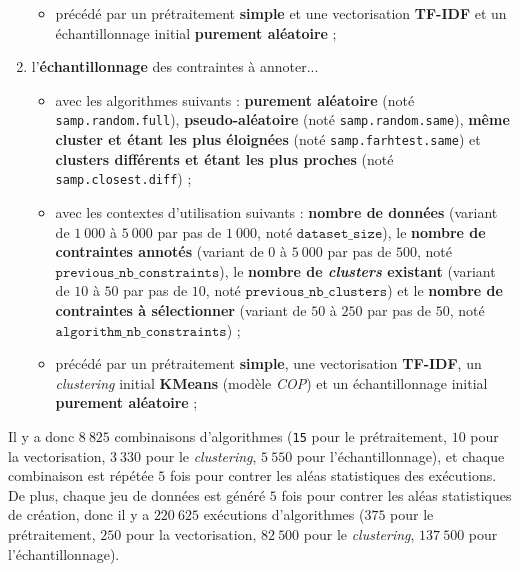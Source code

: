 \begin{enumerate}
\begin{itemize}
						\item précédé par un prétraitement \textbf{simple} et une vectorisation \textbf{TF-IDF} et un échantillonnage initial \textbf{purement aléatoire} ;
					\end{itemize}
				\item l'\textbf{échantillonnage} des contraintes à annoter...
					\begin{itemize}
						\item avec les algorithmes suivants : \textbf{purement aléatoire} (noté \texttt{samp.random.full}), \textbf{pseudo-aléatoire} (noté \texttt{samp.random.same}), \textbf{même cluster et étant les plus éloignées} (noté \texttt{samp.farhtest.same}) et \textbf{clusters différents et étant les plus proches} (noté \texttt{samp.closest.diff}) ;
						\item avec les contextes d'utilisation suivants : \textbf{nombre de données} (variant de $1~000$ à $5~000$ par pas de $1~000$, noté $\texttt{dataset\_size}$), le \textbf{nombre de contraintes annotés} (variant de $0$ à $5~000$ par pas de $500$, noté $\texttt{previous\_nb\_constraints}$), le \textbf{nombre de \textit{clusters} existant} (variant de $10$ à $50$ par pas de $10$, noté $\texttt{previous\_nb\_clusters}$) et le \textbf{nombre de contraintes à sélectionner} (variant de $50$ à $250$ par pas de $50$, noté $\texttt{algorithm\_nb\_constraints}$) ;
						\item précédé par un prétraitement \textbf{simple}, une vectorisation \textbf{TF-IDF}, un \textit{clustering} initial \textbf{KMeans} (modèle \textit{COP}) et un échantillonnage initial \textbf{purement aléatoire} ;
					\end{itemize}
			\end{enumerate}
			
			Il y a donc $8~825$ combinaisons d'algorithmes (\texttt{15} pour le prétraitement, $10$ pour la vectorisation, $3~330$ pour le \textit{clustering}, $5~550$ pour l'échantillonnage), et chaque combinaison est répétée $5$ fois pour contrer les aléas statistiques des exécutions.
			De plus, chaque jeu de données est généré $5$ fois pour contrer les aléas statistiques de création, donc il y a $220~625$ exécutions d'algorithmes ($375$ pour le prétraitement, $250$ pour la vectorisation, $82~500$ pour le \textit{clustering}, $137~500$ pour l'échantillonnage).
			
